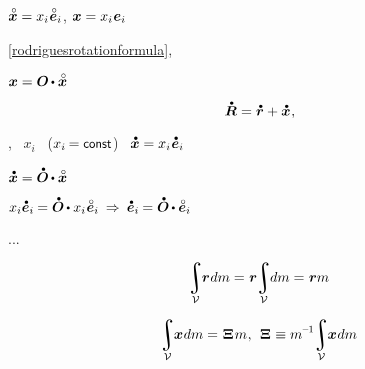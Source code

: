 ${\mathcircabove{\bm{x}} = x_i \hspace{.1ex} \mathcircabove{\bm{e}}_i}$,
${\bm{x} = x_i \hspace{.1ex} \bm{e}_i}$

\eqref{rodriguesrotationformula}, 

${\bm{x} = \rotationtensor \hspace{-0.15ex} \dotp \mathcircabove{\bm{x}}}$

\begin{equation*}
\mathdotabove{\bm{R}} = \mathdotabove{\bm{r}} + \mathdotabove{\bm{x}}
\hspace{.1ex} ,
\end{equation*}

, ~${x_i}$ ~(${x_i \hspace{-0.16ex} = \const}$) ~${\mathdotabove{\bm{x}} = x_i \hspace{.1ex} \mathdotabove{\bm{e}}_i}$

${\mathdotabove{\bm{x}} = \mathdotabove{\rotationtensor} \hspace{-0.15ex} \dotp \mathcircabove{\bm{x}}}$

${x_i \mathdotabove{\bm{e}}_i \hspace{-0.12ex} = \mathdotabove{\rotationtensor} \hspace{-0.15ex} \dotp x_i \hspace{.1ex} \mathcircabove{\bm{e}}_i
\:\Rightarrow\:
\mathdotabove{\bm{e}}_i \hspace{-0.12ex} = \mathdotabove{\rotationtensor} \hspace{-0.15ex} \dotp \mathcircabove{\bm{e}}_i}$

...

\[
\hspace{-0.4ex} \integral_{\mathcal{V}} \hspace{-0.6ex} \bm{r} \hspace{.1ex} dm = \hspace{.1ex} \bm{r} \hspace{-0.5ex} \integral_{\mathcal{V}} \hspace{-0.6ex} dm = \hspace{.1ex} \bm{r} m
\]

\[
\hspace{-0.4ex} \integral_{\mathcal{V}} \hspace{-0.6ex} \bm{x} \hspace{.1ex} dm = \hspace{.15ex} \bm{\Xi} \hspace{.2ex} m
\hspace{.1ex} , \:\:
\bm{\Xi} \hspace{.1ex} \equiv m^{\hspace{-0.1ex}\expminusone} \hspace{-0.5ex} \integral_{\mathcal{V}} \hspace{-0.6ex} \bm{x} \hspace{.1ex} dm
\]


